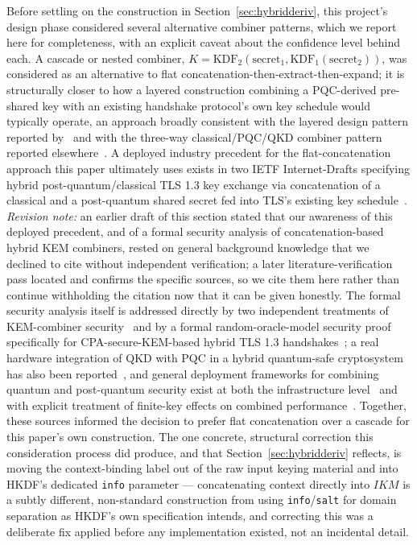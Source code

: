\documentclass[journal]{IEEEtran}
\begin{document}
Before settling on the construction in Section~\ref{sec:hybridderiv}, this project's design phase considered several alternative combiner patterns, which we report here for completeness, with an explicit caveat about the confidence level behind each. A cascade or nested combiner, $K = \mathrm{KDF}_2(\text{secret}_1, \mathrm{KDF}_1(\text{secret}_2))$, was considered as an alternative to flat concatenation-then-extract-then-expand; it is structurally closer to how a layered construction combining a PQC-derived pre-shared key with an existing handshake protocol's own key schedule would typically operate, an approach broadly consistent with the layered design pattern reported by~\cite{spooren2026pqcenhanced} and with the three-way classical/PQC/QKD combiner pattern reported elsewhere~\cite{threewayhybrid2025}. A deployed industry precedent for the flat-concatenation approach this paper ultimately uses exists in two IETF Internet-Drafts specifying hybrid post-quantum/classical TLS 1.3 key exchange via concatenation of a classical and a post-quantum shared secret fed into TLS's existing key schedule~\cite{ietf2026tlshybrid,ietf2026mlkemtls}. \emph{Revision note:} an earlier draft of this section stated that our awareness of this deployed precedent, and of a formal security analysis of concatenation-based hybrid KEM combiners, rested on general background knowledge that we declined to cite without independent verification; a later literature-verification pass located and confirms the specific sources, so we cite them here rather than continue withholding the citation now that it can be given honestly. The formal security analysis itself is addressed directly by two independent treatments of KEM-combiner security~\cite{focombiners2021,bestofbothkems2025} and by a formal random-oracle-model security proof specifically for CPA-secure-KEM-based hybrid TLS 1.3 handshakes~\cite{chen2025tls13hybrid}; a real hardware integration of QKD with PQC in a hybrid quantum-safe cryptosystem has also been reported~\cite{garms2024hybridqkdpqc}, and general deployment frameworks for combining quantum and post-quantum security exist at both the infrastructure level~\cite{deployinghybrid2023} and with explicit treatment of finite-key effects on combined performance~\cite{combinedqpq2025finitekeys}. Together, these sources informed the decision to prefer flat concatenation over a cascade for this paper's own construction. The one concrete, structural correction this consideration process did produce, and that Section~\ref{sec:hybridderiv} reflects, is moving the context-binding label out of the raw input keying material and into HKDF's dedicated \texttt{info} parameter --- concatenating context directly into $IKM$ is a subtly different, non-standard construction from using \texttt{info}/\texttt{salt} for domain separation as HKDF's own specification intends, and correcting this was a deliberate fix applied before any implementation existed, not an incidental detail.
\end{document}
